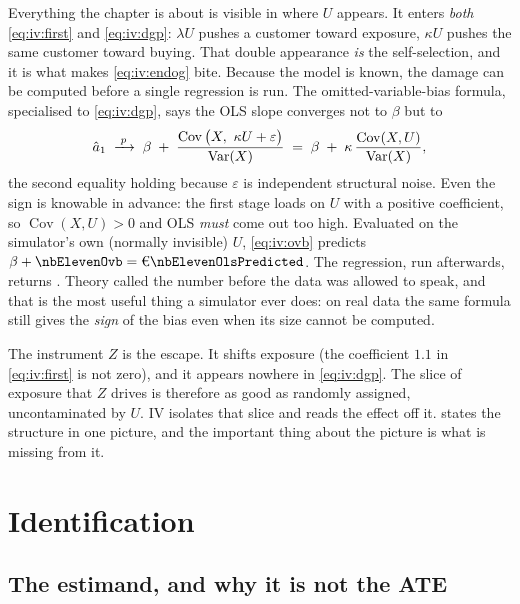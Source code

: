 Everything the chapter is about is visible in where $U$ appears. It enters \emph{both}
\cref{eq:iv:first} and \cref{eq:iv:dgp}: $\lambda U$ pushes a customer toward exposure, $\kappa U$
pushes the same customer toward buying. That double appearance \emph{is} the self-selection, and it is
what makes \cref{eq:iv:endog} bite. Because the model is known, the damage can be computed before
a single regression is run. The omitted-variable-bias formula, specialised to \cref{eq:iv:dgp},
says the OLS slope converges not to $\beta$ but to
%
\begin{equation}
  \hat a_1 \;\xrightarrow{\;p\;}\; \beta \;+\;
  \frac{\operatorname{Cov}\big(X,\ \kappa U + \varepsilon\big)}{\operatorname{Var}(X)}
  \;=\; \beta \;+\; \kappa\,\frac{\operatorname{Cov}(X, U)}{\operatorname{Var}(X)},
  \label{eq:iv:ovb}
\end{equation}
%
the second equality holding because $\varepsilon$ is independent structural noise. Even the sign is
knowable in advance: the first stage loads on $U$ with a positive coefficient, so
$\operatorname{Cov}(X,U) > 0$ and OLS \emph{must} come out too high. Evaluated on the simulator's
own (normally invisible) $U$, \cref{eq:iv:ovb} predicts $\beta + \nbElevenOvb =
\eur{\nbElevenOlsPredicted}$. The regression, run afterwards, returns \eur{\nbElevenNaive}. Theory
called the number before the data was allowed to speak, and that is the most useful thing a
simulator ever does: on real data the same formula still gives the \emph{sign} of the bias even
when its size cannot be computed.

The instrument $Z$ is the escape. It shifts exposure (the coefficient $1.1$ in
\cref{eq:iv:first} is not zero), and it appears nowhere in \cref{eq:iv:dgp}. The slice of exposure
that $Z$ drives is therefore as good as randomly assigned, uncontaminated by $U$. IV isolates that
slice and reads the effect off it.  states the structure in one picture, and the
important thing about the picture is what is missing from it.



\section{Identification}
\label{sec:iv:ident}

\subsection*{The estimand, and why it is not the ATE}

